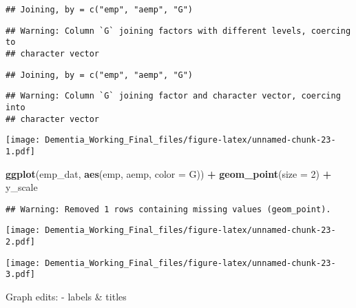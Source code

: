 \documentclass[]{article}
\newenvironment{Shaded}{\begin{snugshade}}{\end{snugshade}}
\newcommand{\DataTypeTok}[1]{\textcolor[rgb]{0.13,0.29,0.53}{#1}}
\newcommand{\DecValTok}[1]{\textcolor[rgb]{0.00,0.00,0.81}{#1}}
\newcommand{\KeywordTok}[1]{\textcolor[rgb]{0.13,0.29,0.53}{\textbf{#1}}}
\newcommand{\NormalTok}[1]{#1}
\newcommand{\OperatorTok}[1]{\textcolor[rgb]{0.81,0.36,0.00}{\textbf{#1}}}
\newcommand{\StringTok}[1]{\textcolor[rgb]{0.31,0.60,0.02}{#1}}
\begin{document}
\begin{verbatim}
## Joining, by = c("emp", "aemp", "G")
\end{verbatim}

\begin{verbatim}
## Warning: Column `G` joining factors with different levels, coercing to
## character vector
\end{verbatim}

\begin{verbatim}
## Joining, by = c("emp", "aemp", "G")
\end{verbatim}

\begin{verbatim}
## Warning: Column `G` joining factor and character vector, coercing into
## character vector
\end{verbatim}

\begin{Shaded}
\end{Shaded}

\texttt{[image: Dementia\_Working\_Final\_files/figure-latex/unnamed-chunk-23-1.pdf]}

\begin{Shaded}
\begin{Highlighting}[]
\KeywordTok{ggplot}\NormalTok{(emp_dat, }\KeywordTok{aes}\NormalTok{(emp, aemp, }\DataTypeTok{color =}\NormalTok{ G)) }\OperatorTok{+}\StringTok{ }\KeywordTok{geom_point}\NormalTok{(}\DataTypeTok{size =} \DecValTok{2}\NormalTok{) }\OperatorTok{+}\StringTok{ }\NormalTok{y_scale}
\end{Highlighting}
\end{Shaded}

\begin{verbatim}
## Warning: Removed 1 rows containing missing values (geom_point).
\end{verbatim}

\texttt{[image: Dementia\_Working\_Final\_files/figure-latex/unnamed-chunk-23-2.pdf]}

\begin{Shaded}
\end{Shaded}

\texttt{[image: Dementia\_Working\_Final\_files/figure-latex/unnamed-chunk-23-3.pdf]}

Graph edits: - labels \& titles
\end{document}
